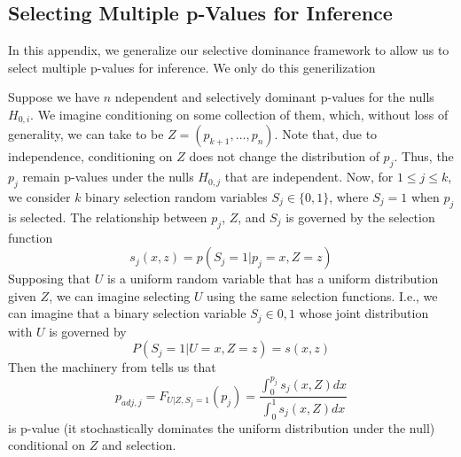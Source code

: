 \documentclass{article}
\begin{document}
\begin{appendix}
\section{Selecting Multiple p-Values for Inference}
\label{sec:multiple_p_vals_appdx}

In this appendix, we generalize our selective dominance framework to allow us to select multiple p-values for inference. We only do this generilization 

Suppose we have $n$ ndependent and selectively dominant p-values for the nulls $H_{0, i}$. We imagine conditioning on some collection of them, which, without loss of generality, we can take to be $Z = (p_{k+1}, \dots, p_n)$. Note that, due to independence, conditioning on $Z$ does not change the distribution of $p_j$. Thus, the $p_j$ remain p-values under the nulls $H_{0, j}$ that are independent. Now, for $1 \leq j \leq k$, we consider $k$ binary selection random variables $S_j \in \{0, 1\}$, where $S_j = 1$ when $p_j$ is selected. The relationship between $p_j$, $Z$, and $S_j$ is governed by the selection function 
\begin{equation*}
    s_j(x, z) = p(S_j = 1 | p_j = x, Z=z)
\end{equation*} 
Supposing that $U$ is a uniform random variable that has a uniform distribution given $Z$, we can imagine selecting $U$ using the same selection functions. I.e., we can imagine that a binary selection variable $S_j \in {0, 1}$ whose joint distribution with $U$ is governed by 
\begin{equation*}
    P(S_j = 1| U = x, Z = z) = s(x, z)
\end{equation*}
Then the machinery from  tells us that 
\begin{equation*}
    p_{adj, j} = F_{U |Z, S_j = 1}(p_j) = \frac{\int_0^{p_j} s_j(x, Z)dx }{\int_0^1 s_j(x, Z)dx}
\end{equation*}
is p-value (it stochastically dominates the uniform distribution under the null) conditional on $Z$ and selection. 


\end{appendix}
\end{document}
